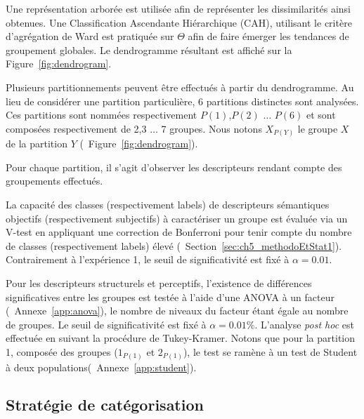 Une représentation arborée est utilisée afin de représenter les dissimilarités ainsi obtenues. Une Classification Ascendante Hiérarchique (CAH), utilisant le critère d’agrégation de Ward est pratiquée sur $\Theta$  afin de faire émerger les tendances de groupement globales. Le dendrogramme résultant est affiché sur la Figure~\ref{fig:dendrogram}. 

Plusieurs partitionnements peuvent être effectués à partir du dendrogramme. Au lieu de considérer une partition particulière, 6  partitions distinctes sont analysées. Ces partitions sont nommées respectivement $P(1)$,$P(2)$ $\ldots$ $P(6)$ et sont composées respectivement de 2,3 $\ldots$ 7 groupes. Nous notons $X_{P(Y)}$ le groupe $X$ de la partition $Y$ (\cf~Figure~\ref{fig:dendrogram}).

Pour chaque partition, il s'agit d'observer les descripteurs rendant compte des groupements effectués. 

La capacité des classes (respectivement labels) de descripteurs sémantiques objectifs (respectivement subjectifs) à caractériser un groupe est évaluée via un V-test en appliquant une correction de Bonferroni pour tenir compte du nombre de classes (respectivement labels) élevé (\cf~Section~\ref{sec:ch5_methodoEtStat1}). Contrairement à l'expérience 1, le seuil de significativité est fixé à $\alpha=0.01$.

Pour les descripteurs structurels et perceptifs, l'existence de différences significatives entre les groupes est testée à l'aide d'une ANOVA à un facteur (\cf~Annexe~\ref{app:anova}), le nombre de niveaux du facteur étant égale au nombre de groupes. Le seuil de significativité est fixé à $\alpha=0.01\%$. L'analyse \emph{post hoc} est effectuée en suivant la procédure de Tukey-Kramer. Notons que pour la partition 1, composée des groupes ($1_{P(1)}$ et $2_{P(1)}$), le test se ramène à un test de Student à deux populations(\cf~Annexe~\ref{app:student}).

\subsection{Stratégie de catégorisation}

